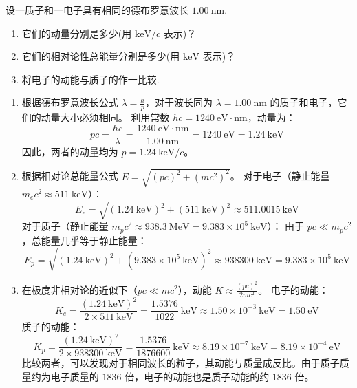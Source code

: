 \begin{exercise}\label{ex:23.4}
设一质子和一电子具有相同的德布罗意波长 $1.00 \ \mathrm{nm}$. 
\begin{enumerate}
  \item[(a)] 它们的动量分别是多少(用 $\mathrm{keV}/c$ 表示)？
  \item[(b)] 它们的相对论性总能量分别是多少(用 $\mathrm{keV}$ 表示)？
  \item[(c)] 将电子的动能与质子的作一比较.
\end{enumerate}
\end{exercise}
\begin{solution}
\begin{enumerate}
    \item[(a)] 根据德布罗意波长公式 $\lambda = \frac{h}{p}$，对于波长同为 $\lambda = 1.00 \ \mathrm{nm}$ 的质子和电子，它们的动量大小必须相同。
    利用常数 $hc = 1240 \ \mathrm{eV \cdot nm}$，动量为：
    $$ pc = \frac{hc}{\lambda} = \frac{1240 \ \mathrm{eV \cdot nm}}{1.00 \ \mathrm{nm}} = 1240 \ \mathrm{eV} = 1.24 \ \mathrm{keV} $$
    因此，两者的动量均为 $p = 1.24 \ \mathrm{keV}/c$。

    \item[(b)] 根据相对论总能量公式 $E = \sqrt{(pc)^2 + (mc^2)^2}$。
    对于电子（静止能量 $m_e c^2 \approx 511 \ \mathrm{keV}$）：
    $$ E_e = \sqrt{(1.24 \ \mathrm{keV})^2 + (511 \ \mathrm{keV})^2} \approx 511.0015 \ \mathrm{keV} $$
    对于质子（静止能量 $m_p c^2 \approx 938.3 \ \mathrm{MeV} = 9.383 \times 10^5 \ \mathrm{keV}$）：
    由于 $pc \ll m_p c^2$，总能量几乎等于静止能量：
    $$ E_p = \sqrt{(1.24 \ \mathrm{keV})^2 + (9.383 \times 10^5 \ \mathrm{keV})^2} \approx 938300 \ \mathrm{keV} = 9.383 \times 10^5 \ \mathrm{keV} $$

    \item[(c)] 在极度非相对论的近似下（$pc \ll mc^2$），动能 $K \approx \frac{(pc)^2}{2mc^2}$。
    电子的动能：
    $$ K_e = \frac{(1.24 \ \mathrm{keV})^2}{2 \times 511 \ \mathrm{keV}} = \frac{1.5376}{1022} \ \mathrm{keV} \approx 1.50 \times 10^{-3} \ \mathrm{keV} = 1.50 \ \mathrm{eV} $$
    质子的动能：
    $$ K_p = \frac{(1.24 \ \mathrm{keV})^2}{2 \times 938300 \ \mathrm{keV}} = \frac{1.5376}{1876600} \ \mathrm{keV} \approx 8.19 \times 10^{-7} \ \mathrm{keV} = 8.19 \times 10^{-4} \ \mathrm{eV} $$
    比较两者，可以发现对于相同波长的粒子，其动能与质量成反比。由于质子质量约为电子质量的 $1836$ 倍，电子的动能也是质子动能的约 $1836$ 倍。
\end{enumerate}
\end{solution}

